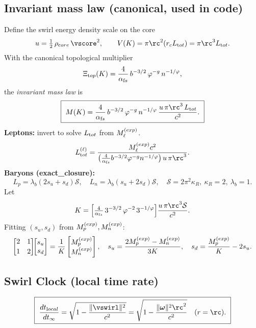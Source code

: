 \documentclass[11pt]{article}
\begin{document}
    \subsection*{Invariant mass law (canonical, used in code)}
        Define the swirl energy density scale on the core
        \[
            u=\tfrac12\,\rho_{\textrm core}\,\vscore^2,
            \qquad
            V(K)=\pi \rc^2 (r_c L_{\textrm tot})=\pi \rc^3 L_{\textrm tot}.
        \]
        With the canonical topological multiplier
        \[
            \Xi_{\textrm top}(K)=\frac{4}{\alpha_{\textrm fs}}\,b^{-3/2}\,\varphi^{-g}\,n^{-1/\varphi},
        \]
        the \emph{invariant mass law} is
        \[
            \boxed{~
            M(K)=\frac{4}{\alpha_{\textrm fs}}\,b^{-3/2}\,\varphi^{-g}\,n^{-1/\varphi}\,
            \frac{u\,\pi \rc^3\,L_{\textrm tot}}{c^2}.
            ~}
        \]
        \textbf{Leptons:} invert to solve $L_{\textrm tot}$ from $M_\ell^{\textrm (exp)}$.
        \[
            L_{\textrm tot}^{(\ell)}=
            \frac{M_\ell^{\textrm (exp)} c^2}
            {\big(\tfrac{4}{\alpha_{\textrm fs}}b^{-3/2}\varphi^{-g}n^{-1/\varphi}\big)\,u\,\pi \rc^3}.
        \]
        \textbf{Baryons (exact\_closure):}
        \[
            L_p=\lambda_b(2s_u+s_d)\mathcal S,\quad
            L_n=\lambda_b(s_u+2s_d)\mathcal S,\quad
            \mathcal S=2\pi^2\kappa_R,\ \kappa_R=2,\ \lambda_b=1.
        \]
        Let
        \[
            K=\Big[\tfrac{4}{\alpha_{\textrm fs}}\,3^{-3/2}\,\varphi^{-2}\,3^{-1/\varphi}\Big]
            \frac{u\,\pi \rc^3\mathcal S}{c^2}.
        \]
        Fitting $(s_u,s_d)$ from $M_p^{\textrm (exp)},M_n^{\textrm (exp)}$:
        \[
            \begin{bmatrix}2&1\\[2pt]1&2\end{bmatrix}\!\!
            \begin{bmatrix}s_u\\ s_d\end{bmatrix}
            =\frac{1}{K}\begin{bmatrix}M_p^{\textrm (exp)}\\ M_n^{\textrm (exp)}\end{bmatrix},
            \quad
            s_u=\frac{2M_p^{\textrm (exp)}-M_n^{\textrm (exp)}}{3K},\quad
            s_d=\frac{M_p^{\textrm (exp)}}{K}-2s_u.
        \]

    \subsection*{Swirl Clock (local time rate)}
        \[
            \boxed{~
            \frac{dt_{\textrm local}}{dt_\infty}=\sqrt{1-\frac{\|\vswirl\|^{2}}{c^{2}}}
                =\sqrt{1-\frac{\|\boldsymbol\omega\|^{2}\rc^{2}}{c^{2}}}\quad(r=\rc).
                ~}
        \]
\end{document}
